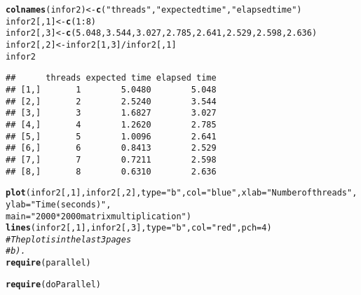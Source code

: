 \documentclass{article}\usepackage[]{graphicx}\usepackage[]{color}
\makeatletter
\newcommand{\hlnum}[1]{\textcolor[rgb]{0.686,0.059,0.569}{#1}}%
\newcommand{\hlstr}[1]{\textcolor[rgb]{0.192,0.494,0.8}{#1}}%
\newcommand{\hlcom}[1]{\textcolor[rgb]{0.678,0.584,0.686}{\textit{#1}}}%
\newcommand{\hlopt}[1]{\textcolor[rgb]{0,0,0}{#1}}%
\newcommand{\hlstd}[1]{\textcolor[rgb]{0.345,0.345,0.345}{#1}}%
\newcommand{\hlkwb}[1]{\textcolor[rgb]{0.69,0.353,0.396}{#1}}%
\newcommand{\hlkwc}[1]{\textcolor[rgb]{0.333,0.667,0.333}{#1}}%
\newcommand{\hlkwd}[1]{\textcolor[rgb]{0.737,0.353,0.396}{\textbf{#1}}}%
\newenvironment{kframe}{%
 \def\at@end@of@kframe{}%
 \ifinner\ifhmode%
  \def\at@end@of@kframe{\end{minipage}}%
  \begin{minipage}{\columnwidth}%
 \fi\fi%
 \def\FrameCommand##1{\hskip\@totalleftmargin \hskip-\fboxsep
 \colorbox{shadecolor}{##1}\hskip-\fboxsep
     \hskip-\linewidth \hskip-\@totalleftmargin \hskip\columnwidth}%
 \MakeFramed {\advance\hsize-\width
   \@totalleftmargin\z@ \linewidth\hsize
   \@setminipage}}%
 {\par\unskip\endMakeFramed%
 \at@end@of@kframe}
\newenvironment{knitrout}{}{} %
\makeatother
\begin{document}
\begin{knitrout}
\begin{kframe}
\begin{alltt}
\hlkwd{colnames}\hlstd{(infor2)} \hlkwb{<-} \hlkwd{c}\hlstd{(}\hlstr{"threads"}\hlstd{,} \hlstr{"expected time"}\hlstd{,} \hlstr{"elapsed time"}\hlstd{)}
\hlstd{infor2[,} \hlnum{1}\hlstd{]} \hlkwb{<-} \hlkwd{c}\hlstd{(}\hlnum{1}\hlopt{:}\hlnum{8}\hlstd{)}
\hlstd{infor2[,} \hlnum{3}\hlstd{]} \hlkwb{<-} \hlkwd{c}\hlstd{(}\hlnum{5.048}\hlstd{,} \hlnum{3.544}\hlstd{,} \hlnum{3.027}\hlstd{,} \hlnum{2.785}\hlstd{,} \hlnum{2.641}\hlstd{,} \hlnum{2.529}\hlstd{,} \hlnum{2.598}\hlstd{,} \hlnum{2.636}\hlstd{)}
\hlstd{infor2[,} \hlnum{2}\hlstd{]} \hlkwb{<-} \hlstd{infor2[}\hlnum{1}\hlstd{,} \hlnum{3}\hlstd{]}\hlopt{/}\hlstd{infor2[,} \hlnum{1}\hlstd{]}
\hlstd{infor2}
\end{alltt}
\begin{verbatim}
##      threads expected time elapsed time
## [1,]       1        5.0480        5.048
## [2,]       2        2.5240        3.544
## [3,]       3        1.6827        3.027
## [4,]       4        1.2620        2.785
## [5,]       5        1.0096        2.641
## [6,]       6        0.8413        2.529
## [7,]       7        0.7211        2.598
## [8,]       8        0.6310        2.636
\end{verbatim}
\begin{alltt}
\hlkwd{plot}\hlstd{(infor2[,} \hlnum{1}\hlstd{], infor2[,} \hlnum{2}\hlstd{],} \hlkwc{type} \hlstd{=} \hlstr{"b"}\hlstd{,} \hlkwc{col} \hlstd{=} \hlstr{"blue"}\hlstd{,} \hlkwc{xlab} \hlstd{=} \hlstr{"Number of threads"}\hlstd{,} \hlkwc{ylab} \hlstd{=} \hlstr{"Time(seconds)"}\hlstd{,}
    \hlkwc{main} \hlstd{=} \hlstr{"2000*2000 matrix multiplication"}\hlstd{)}
\hlkwd{lines}\hlstd{(infor2[,} \hlnum{1}\hlstd{], infor2[,} \hlnum{3}\hlstd{],} \hlkwc{type} \hlstd{=} \hlstr{"b"}\hlstd{,} \hlkwc{col} \hlstd{=} \hlstr{"red"}\hlstd{,} \hlkwc{pch} \hlstd{=} \hlnum{4}\hlstd{)}
\hlcom{# The plot is in the last 3 pages}
\hlcom{# b).}
\hlkwd{require}\hlstd{(parallel)}
\end{alltt}


{\ttfamily\noindent\itshape\color{messagecolor}{\#\# Loading required package: parallel}}\begin{alltt}
\hlkwd{require}\hlstd{(doParallel)}
\end{alltt}



\end{kframe}
\end{knitrout}
\end{document}
